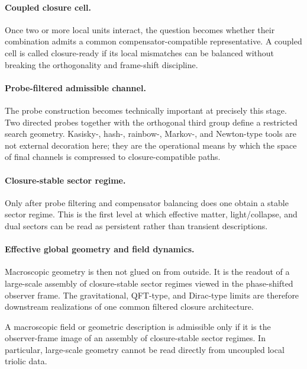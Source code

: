 \paragraph{Coupled closure cell.}
Once two or more local units interact, the question becomes whether their
combination admits a common compensator-compatible representative. A coupled
cell is called closure-ready if its local mismatches can be balanced without
breaking the orthogonality and frame-shift discipline.

\paragraph{Probe-filtered admissible channel.}
The probe construction becomes technically important at precisely this stage.
Two directed probes together with the orthogonal third group define a restricted
search geometry. Kasisky-, hash-, rainbow-, Markov-, and Newton-type tools are
not external decoration here; they are the operational means by which the space
of final channels is compressed to closure-compatible paths.

\paragraph{Closure-stable sector regime.}
Only after probe filtering and compensator balancing does one obtain a stable
sector regime. This is the first level at which effective matter, light/collapse,
and dual sectors can be read as persistent rather than transient descriptions.

\paragraph{Effective global geometry and field dynamics.}
Macroscopic geometry is then not glued on from outside. It is the readout of a
large-scale assembly of closure-stable sector regimes viewed in the
phase-shifted observer frame. The gravitational, QFT-type, and Dirac-type
limits are therefore downstream realizations of one common filtered closure
architecture.

\begin{proposition}
\label{prop:macro-requires-closure-assembly}
A macroscopic field or geometric description is admissible only if it is the
observer-frame image of an assembly of closure-stable sector regimes. In
particular, large-scale geometry cannot be read directly from uncoupled local
triolic data.
\end{proposition}

